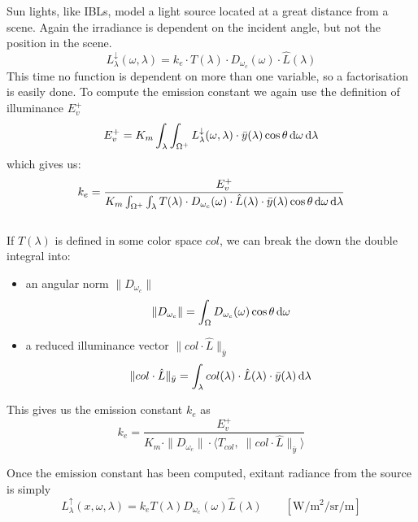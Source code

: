 Sun lights, like \glspl{IBL}, model a light source located at a great distance from
a scene. Again the irradiance is dependent on the incident angle, but not the
position in the scene.
\begin{equation}
L^\downarrow_{\lambda}(\omega,\lambda) = k_e\cdot T(\lambda)\cdot
D_{\omega_c}(\omega)\cdot \hat{L}(\lambda)
\end{equation}
This time no function is dependent on more than one variable, so a factorisation is easily done.
To compute the emission constant we again use the definition of illuminance
$E^+_v$
\begin{equation}
E^+_v = K_m \int_\lambda \int_{\Omega^+} L^\downarrow_{\lambda}(\omega,\lambda) \cdot\bar y(\lambda)\cos\theta\mathop{}\!\mathrm{d}\omega \mathop{}\!\mathrm{d}\lambda
\end{equation}
which gives us:
\begin{equation}
k_e = \frac{E^+_v}{K_m\int_{\Omega^+}\int_{\lambda} T(\lambda)\cdot D_{\omega_c}(\omega)\cdot \hat{L}(\lambda) \cdot \bar y(\lambda)\cos\theta\mathop{}\!\mathrm{d}\omega \mathop{}\!\mathrm{d}\lambda}
\end{equation}
\\
If $T(\lambda)$ is defined in some color space $col$, we can break the down the double integral into:
\begin{itemize}
\item an angular norm $\|D_{\omega_c}\|$
\begin{equation}
\|D_{\omega_c}\| = \int_\Omega D_{\omega_c}(\omega)\cos\theta\mathop{}\!\mathrm{d}\omega
\end{equation}
\item a reduced illuminance vector $\|col \cdot \hat{L}\|_{\bar{y}}$
\begin{equation}
\|col \cdot \hat{L}\|_{\bar{y}} = \int_\lambda col(\lambda)\cdot \hat{L}(\lambda)\cdot\bar{y}(\lambda)\mathop{}\!\mathrm{d}\lambda
\end{equation}
\end{itemize}
This gives us the emission constant $k_e$ as
\begin{equation}
k_e = \frac{E^+_v}{K_m\cdot \|D_{\omega_c}\|\cdot \big\langle T_{col}, \; \|col \cdot \hat{L}\|_{\bar{y}} \big\rangle}
\end{equation}

Once the emission constant has been computed, exitant radiance from the source
is simply
\begin{equation}
L^\uparrow_{\lambda}(x, \omega, \lambda) = k_e  T(\lambda)
D_{\omega_c}(\omega) \hat{L}(\lambda)
\qquad \left[\unit{\watt\per\square\meter\per\steradian\per\meter}\right]
\end{equation}

